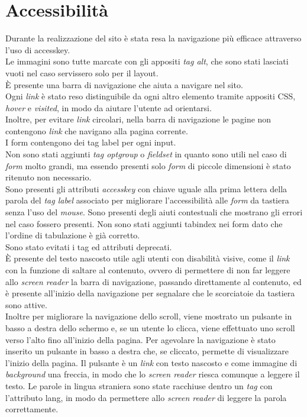\section{Accessibilità}

Durante la realizzazione del sito è stata resa la navigazione più efficace attraverso l'uso di accesskey.\\
Le immagini sono tutte marcate con gli appositi \textit{tag alt}, che sono stati lasciati vuoti nel caso servissero solo per il layout.\\
È presente una barra di navigazione che aiuta a navigare nel sito.\\ 
Ogni \textit{link} è stato reso distinguibile da ogni altro elemento tramite appositi CSS, \textit{hover} e \textit{visited}, in modo da aiutare l'utente ad orientarsi. \\
Inoltre, per evitare \textit{link} circolari, nella barra di navigazione le pagine non contengono \textit{link} che navigano alla pagina corrente.\\
I form contengono dei tag label per ogni input.\\ 
Non sono stati aggiunti \textit{tag optgroup} o \textit{fieldset} in quanto sono utili nel caso di \textit{form} molto grandi, ma essendo presenti solo \textit{form} di piccole dimensioni è stato ritenuto non necessario.\\ 
Sono presenti gli attributi \textit{accesskey} con chiave uguale alla prima lettera della parola del \textit{tag label} associato per migliorare l'accessibilità alle \textit{form} da tastiera senza l'uso del \textit{mouse}. 
Sono presenti degli aiuti contestuali che mostrano gli errori nel caso fossero presenti. Non sono stati aggiunti tabindex nei form dato che l'ordine di tabulazione è già corretto.\\
Sono stato evitati i tag ed attributi deprecati.\\
È presente del testo nascosto utile agli utenti con disabilità visive, come il \textit{link} con la funzione  di saltare al contenuto, ovvero di permettere di non far leggere allo \textit{screen reader} la barra di navigazione, passando direttamente al contenuto, ed è presente all'inizio della navigazione
 per segnalare che le scorciatoie da tastiera sono attive.\\
Inoltre per migliorare la navigazione dello scroll, viene mostrato un pulsante in basso
a destra dello schermo e, se un utente lo clicca, viene effettuato uno scroll verso l'alto fino all'inizio della pagina.
Per agevolare la navigazione è stato inserito un pulsante in basso a destra che, se cliccato, permette di visualizzare l'inizio della pagina. Il pulsante è un \textit{link} con testo nascosto e come immagine di \textit{background} una freccia, in modo che lo \textit{screen reader} riesca comunque a leggere il testo.
Le parole in lingua straniera sono state racchiuse dentro un \textit{tag} con l'attributo lang, in modo da permettere allo \textit{screen reader} di leggere la parola correttamente.
